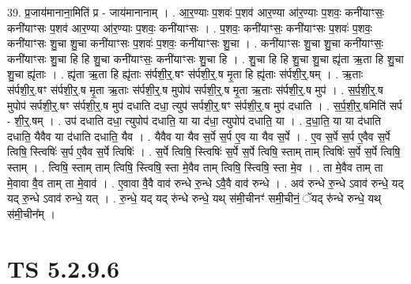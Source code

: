 \documentclass[17pt]{extarticle}
\begin{document}
39. प्र॒जाय॑मानाना॒मिति॑ प्र - जाय॑मानानाम् । . आ॒र॒ण्याः प॒शवः॑ प॒शव॑ आर॒ण्या आ॑र॒ण्याः प॒शवः॒ कनी॑याꣳसः॒ कनी॑याꣳसः प॒शव॑ आर॒ण्या आ॑र॒ण्याः प॒शवः॒ कनी॑याꣳसः । . प॒शवः॒ कनी॑याꣳसः॒ कनी॑याꣳसः प॒शवः॑ प॒शवः॒ कनी॑याꣳसः शु॒चा शु॒चा कनी॑याꣳसः प॒शवः॑ प॒शवः॒ कनी॑याꣳसः शु॒चा । . कनी॑याꣳसः शु॒चा शु॒चा कनी॑याꣳसः॒ कनी॑याꣳसः शु॒चा हि हि शु॒चा कनी॑याꣳसः॒ कनी॑याꣳसः शु॒चा हि । . शु॒चा हि हि शु॒चा शु॒चा ह्यृ॑ता ऋ॒ता हि शु॒चा शु॒चा ह्यृ॑ताः । . ह्यृ॑ता ऋ॒ता हि ह्यृ॑ताः स॑र्पशी॒र्॒.षꣳ स॑र्पशी॒र्॒.ष मृ॒ता हि ह्यृ॑ताः स॑र्पशी॒र्॒.षम् । . ऋ॒ताः स॑र्पशी॒र्॒.षꣳ स॑र्पशी॒र्॒.ष मृ॒ता ऋ॒ताः स॑र्पशी॒र्॒.ष मुपोप॑ सर्पशी॒र्॒.ष मृ॒ता ऋ॒ताः स॑र्पशी॒र्॒.ष मुप॑ । . स॒र्प॒शी॒र्॒.ष मुपोप॑ सर्पशी॒र्॒.षꣳ स॑र्पशी॒र्॒.ष मुप॑ दधाति दधा॒ त्युप॑ सर्पशी॒र्॒.षꣳ स॑र्पशी॒र्॒.ष मुप॑ दधाति । . स॒र्प॒शी॒र्॒.षमिति॑ सर्प - शी॒र्॒.षम् । . उप॑ दधाति दधा॒ त्युपोप॑ दधाति॒ या या द॑धा॒ त्युपोप॑ दधाति॒ या । . द॒धा॒ति॒ या या द॑धाति दधाति॒ यैवैव या द॑धाति दधाति॒ यैव । . यैवैव या यैव स॒र्पे स॒र्प ए॒व या यैव स॒र्पे । . ए॒व स॒र्पे स॒र्प ए॒वैव स॒र्पे त्विषि॒ स्त्विषिः॑ स॒र्प ए॒वैव स॒र्पे त्विषिः॑ । . स॒र्पे त्विषि॒ स्त्विषिः॑ स॒र्पे स॒र्पे त्विषि॒ स्ताम् ताम् त्विषिः॑ स॒र्पे स॒र्पे त्विषि॒ स्ताम् । . त्विषि॒ स्ताम् ताम् त्विषि॒ स्त्विषि॒ स्ता मे॒वैव ताम् त्विषि॒ स्त्विषि॒ स्ता मे॒व । . ता मे॒वैव ताम् ता मे॒वावा वै॒व ताम् ता मे॒वाव॑ । . ए॒वावा वै॒वै वाव॑ रुन्धे रु॒न्धे ऽवै॒वै वाव॑ रुन्धे । . अव॑ रुन्धे रु॒न्धे ऽवाव॑ रुन्धे॒ यद् यद् रु॒न्धे ऽवाव॑ रुन्धे॒ यत् । . रु॒न्धे॒ यद् यद् रु॑न्धे रुन्धे॒ यथ् स॑मी॒चीनꣳ॑ समी॒चीनं॒ ॅयद् रु॑न्धे रुन्धे॒ यथ् स॑मी॒चीन᳚म् । \newline
\pagebreak
{}

\section{ TS 5.2.9.6 }
\end{document}
